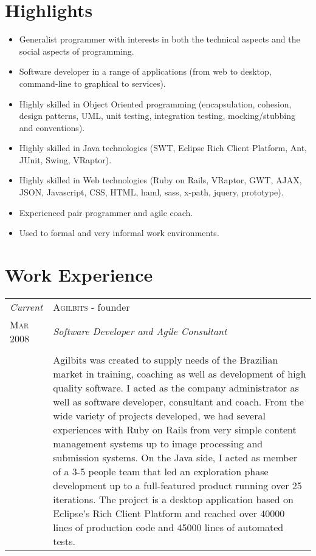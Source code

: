 \documentclass[letter,10pt]{article}
\begin{document}
\section{Highlights}

\begin{itemize}
\item Generalist programmer with interests in both the technical
  aspects and the social aspects of programming.
\item Software developer in a range of applications (from web to
  desktop, command-line to graphical to services).
\item Highly skilled in Object Oriented programming (encapsulation,
  cohesion, design patterns, UML, unit testing, integration testing,
  mocking/stubbing and conventions).
\item Highly skilled in Java technologies (SWT, Eclipse Rich Client
  Platform, Ant, JUnit, Swing, VRaptor).
\item Highly skilled in Web technologies (Ruby on Rails, VRaptor, GWT,
  AJAX, JSON, Javascript, CSS, HTML, haml, sass, x-path, jquery,
  prototype).
\item Experienced pair programmer and agile coach.
\item Used to formal and very informal work environments.
\end{itemize}

\section{Work Experience}

\begin{tabular}{p{2.5cm}|p{13.5cm}}
  \emph{Current} & \textsc{Agilbits} - founder\\
  \textsc{Mar 2008}& \emph{Software Developer and Agile Consultant}\\
  &\\
  &Agilbits was created
  to supply needs of the Brazilian market in training, coaching as
  well as development of high quality software. I acted as the
  company administrator as well as software developer, consultant
  and coach.
  From the wide variety of projects developed, we had several
  experiences with Ruby on Rails from very simple content management
  systems up to image processing and submission systems.
  On the Java side, I acted as member of a 3-5 people team that led an
  exploration phase development up to a full-featured product running
  over 25 iterations. The project is a desktop application based on Eclipse's Rich Client
  Platform and reached over 40000 lines of production code and 45000
  lines of automated tests.
\end{tabular}
\end{document}
